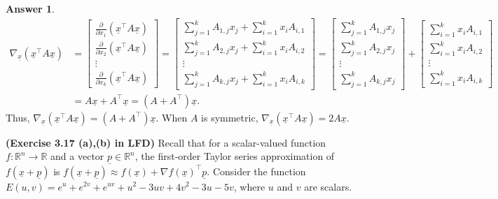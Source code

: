 \documentclass{article}
\renewcommand{\vec}[1]{\underline{#1}}
\newcommand{\vecx}{\vec{x}}
\theoremstyle{definition}
\newtheorem*{answer}{Answer}
\begin{document}
\begin{question}[start=0]
\begin{question}
\begin{answer}
			\begin{align*}
				\nabla_{\!\vecx}(\vecx^\top A \vecx) &= \begin{bmatrix}
					{\frac {\partial }{\partial x_1}}(\vecx^\top A \vecx)\\
					{\frac {\partial }{\partial x_2}}(\vecx^\top A \vecx)\\
					\vdots\\
					{\frac {\partial }{\partial x_k}}(\vecx^\top A \vecx)
				\end{bmatrix} = \begin{bmatrix}
				{\sum\limits_{j=1}^{k} A_{1,j} x_j} + \sum\limits_{i=1}^{k} x_i A_{i, 1}\\
				{\sum\limits_{j=1}^{k} A_{2,j} x_j} + \sum\limits_{i=1}^{k} x_i A_{i, 2}\\
				\vdots\\
				{\sum\limits_{j=1}^{k} A_{k,j} x_j} + \sum\limits_{i=1}^{k} x_i A_{i, k}
				\end{bmatrix} = \begin{bmatrix}
				{\sum\limits_{j=1}^{k} A_{1,j} x_j}\\
				{\sum\limits_{j=1}^{k} A_{2,j} x_j}\\
				\vdots\\
				{\sum\limits_{j=1}^{k} A_{k,j} x_j}
				\end{bmatrix} + \begin{bmatrix}
				\sum\limits_{i=1}^{k} x_i A_{i, 1}\\
				\sum\limits_{i=1}^{k} x_i A_{i, 2}\\
				\vdots\\
				\sum\limits_{i=1}^{k} x_i A_{i, k}
				\end{bmatrix} \\
				&= A \underline{x} + A^\top \underline{x} = (A + A^\top) \underline{x}.
			\end{align*}
			Thus, $\nabla_{\!\vecx}(\vecx^\top A \vecx) = (A + A^\top) \underline{x}$. When $A$ is symmetric, $\nabla_{\!\vecx}(\vecx^\top A \vecx) = 2A\underline{x}$.
		\end{answer}
		\item \textbf{(Exercise 3.17 (a),(b) in LFD)} Recall that for a scalar-valued function $f : \mathbb{R}^n \to \mathbb{R}$ and a vector $\underline{p} \in \mathbb{R}^n$, the first-order Taylor series approximation of $f(\vecx + \vec{p})$ is $f(\vecx + \vec{p}) \approx f(\vecx) + \nabla f(\vecx)^\top \vec{p}$. Consider the function $E(u, v) = e^u + e^{2v} + e^{uv} + u^2 - 3uv + 4v^2 - 3u - 5v$, where $u$ and $v$ are scalars.
		

\end{question}
\end{question}
\end{document}
